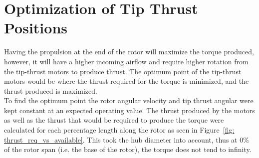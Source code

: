     \section{Optimization of Tip Thrust Positions}
        Having the propulsion at the end of the rotor will maximize the torque produced, however, it will have a higher incoming airflow and require higher rotation from the tip-thrust motors to produce thrust. The optimum point of the tip-thrust motors would be where the thrust required for the torque is minimized, and the thrust produced is maximized.\\
        To find the optimum point the rotor angular velocity and tip thrust angular were kept constant at an expected operating value. The thrust produced by the motors as well as the thrust that would be required to produce the torque were calculated for each percentage length along the rotor as seen in Figure~\ref{fig: thrust_req_vs_available}. This took the hub diameter into account, thus at 0\% of the rotor span (i.e. the base of the rotor), the torque does not tend to infinity.

